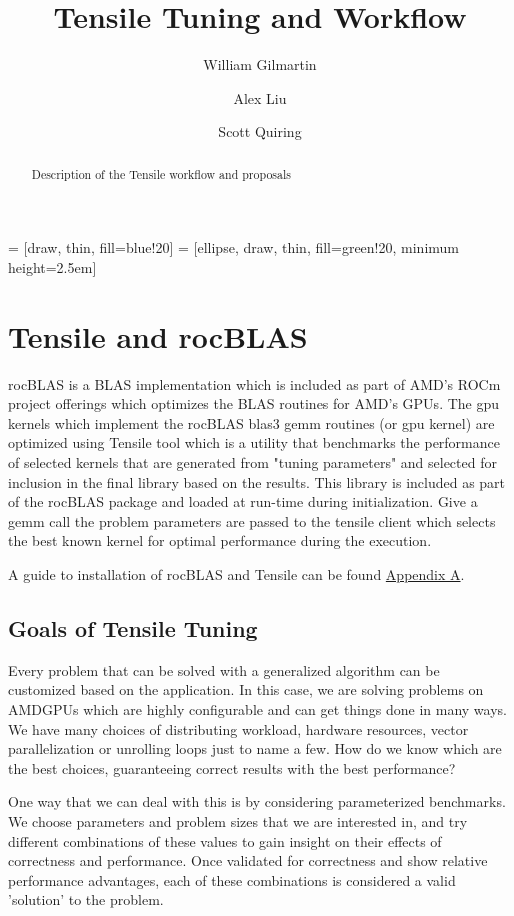 \documentclass[]{article}
\title{Tensile Tuning and Workflow}
\author{William Gilmartin \and Alex Liu \and Scott Quiring}
\begin{document}
\maketitle

\newpage

\tableofcontents

\begin{abstract}
Description of the Tensile workflow and proposals
\end{abstract}


 = [draw, thin, fill=blue!20]
 = [ellipse, draw, thin, fill=green!20, minimum height=2.5em]

\section{Tensile and rocBLAS}


rocBLAS is a BLAS implementation which is included as part of AMD's ROCm project offerings which optimizes the BLAS routines for AMD's GPUs. The gpu kernels which implement the rocBLAS blas3 gemm routines (or gpu kernel) are optimized using Tensile tool which is a utility that benchmarks the performance of selected kernels that are generated from "tuning parameters" and selected for inclusion in the final library based on the results. This library is included as part of the rocBLAS package and loaded at run-time during initialization. Give a gemm call the problem parameters are passed to the tensile client which selects the best known kernel for optimal performance during the execution.
 

A guide to installation of rocBLAS and Tensile can be found \hyperref[sec:appendixA]{Appendix A}.

\subsection{Goals of Tensile Tuning}

Every problem that can be solved with a generalized algorithm can be customized based on the application. In this case, we are solving problems on AMDGPUs which are highly configurable and can get things done in many ways. We have many choices of distributing workload, hardware resources, vector parallelization or unrolling loops just to name a few. How do we know which are the best choices, guaranteeing correct results with the best performance?

One way that we can deal with this is by considering parameterized benchmarks. We choose parameters and problem sizes that we are interested in, and try different combinations of these values to gain insight on their effects of correctness and performance. Once validated for correctness and show relative performance advantages, each of these combinations is considered a valid 'solution' to the problem.
\end{document}
